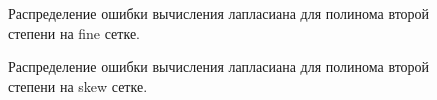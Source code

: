 \begin{figure}[H]
    \centering
    \caption{Распределение ошибки вычисления лапласиана для полинома второй степени на fine сетке.}
    \label{fig:26}
\end{figure}

\begin{figure}[H]
    \centering
    \caption{Распределение ошибки вычисления лапласиана для полинома второй степени на skew сетке.}
    \label{fig:27}
\end{figure}

